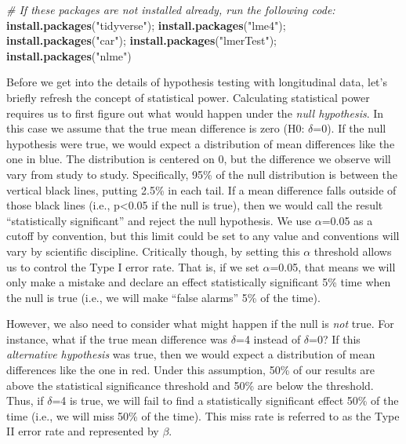 \documentclass[
]{article}
\newenvironment{Shaded}{\begin{snugshade}}{\end{snugshade}}
\newcommand{\CommentTok}[1]{\textcolor[rgb]{0.56,0.35,0.01}{\textit{#1}}}
\newcommand{\FunctionTok}[1]{\textcolor[rgb]{0.13,0.29,0.53}{\textbf{#1}}}
\newcommand{\NormalTok}[1]{#1}
\newcommand{\StringTok}[1]{\textcolor[rgb]{0.31,0.60,0.02}{#1}}
\begin{document}
\begin{Shaded}
\begin{Highlighting}[]
\CommentTok{\# If these packages are not installed already, run the following code: }
\FunctionTok{install.packages}\NormalTok{(}\StringTok{"tidyverse"}\NormalTok{); }\FunctionTok{install.packages}\NormalTok{(}\StringTok{"lme4"}\NormalTok{); }
\FunctionTok{install.packages}\NormalTok{(}\StringTok{"car"}\NormalTok{); }\FunctionTok{install.packages}\NormalTok{(}\StringTok{"lmerTest"}\NormalTok{); }\FunctionTok{install.packages}\NormalTok{(}\StringTok{"nlme"}\NormalTok{)}
\end{Highlighting}
\end{Shaded}

Before we get into the details of hypothesis testing with longitudinal
data, let's briefly refresh the concept of statistical power.
Calculating statistical power requires us to first figure out what would
happen under the \emph{null hypothesis}. In this case we assume that the
true mean difference is zero (H0: \(\delta\)=0). If the null hypothesis
were true, we would expect a distribution of mean differences like the
one in blue. The distribution is centered on 0, but the difference we
observe will vary from study to study. Specifically, 95\% of the null
distribution is between the vertical black lines, putting 2.5\% in each
tail. If a mean difference falls outside of those black lines (i.e.,
p\textless0.05 if the null is true), then we would call the result
``statistically significant'' and reject the null hypothesis. We use
\(\alpha\)=0.05 as a cutoff by convention, but this limit could be set
to any value and conventions will vary by scientific discipline.
Critically though, by setting this \(\alpha\) threshold allows us to
control the Type I error rate. That is, if we set \(\alpha\)=0.05, that
means we will only make a mistake and declare an effect statistically
significant 5\% time when the null is true (i.e., we will make ``false
alarms'' 5\% of the time).

However, we also need to consider what might happen if the null is
\emph{not} true. For instance, what if the true mean difference was
\(\delta\)=4 instead of \(\delta\)=0? If this \emph{alternative
hypothesis} was true, then we would expect a distribution of mean
differences like the one in red. Under this assumption, 50\% of our
results are above the statistical significance threshold and 50\% are
below the threshold. Thus, if \(\delta\)=4 is true, we will fail to find
a statistically significant effect 50\% of the time (i.e., we will miss
50\% of the time). This miss rate is referred to as the Type II error
rate and represented by \(\beta\).
\end{document}
